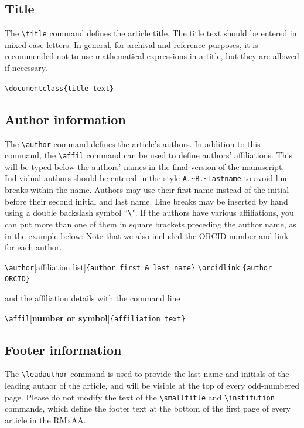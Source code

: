 \documentclass[9pt,article,twoside]{rmaa-rho-class/rmaa-rho}
\newcommand{\CS}[1]{\texttt{\textbackslash #1}}
\begin{document}
    \subsection{Title}

        The \CS{title} command defines the article title. The title text should be entered in mixed case letters. In general, for archival and reference purposes, it is recommended not to use mathematical expressions in a title, but they are allowed if necessary. 

        \bigskip
        \verb|\documentclass{title text}|
        \bigskip

    \subsection{Author information}
    
        The \CS{author} command defines the article’s authors. In addition to this command, the \CS{affil} command can be used to define authors’ affiliations. This will be typed below the authors’ names in the final version of the manuscript. Individual authors should be entered in the style \texttt{A.\~{}B.\~{}Lastname} to avoid line breaks within the name. Authors may use their first name instead of the initial before their second initial and last name.  Line breaks may be inserted by hand using a double backslash symbol “\CS \CS". If the authors have various affiliations, you can put more than one of them in square brackets preceding the author name, as in the example below: Note that we also included the ORCID number and link for each author.
    
        \bigskip
        
        \CS{author}[{affiliation list}]\verb|{author first & last name}|  \CS{orcidlink} \verb|{author ORCID}|
        
        \bigskip
        and the affiliation details with the command line
        
        \bigskip
        \CS{affil}[\textbf{number or symbol}]\verb|{affiliation text}|

        \bigskip
    
    \subsection{Footer information}
    
        The \CS{leadauthor} command is used to provide the last name and initials of the leading author of the article, and will be visible at the top of every odd-numbered page. Please do not modify the text of the \CS{smalltitle} and \CS{institution} commands, which define the footer text at the bottom of the first page of every article in the RMxAA.
    
\end{document}
